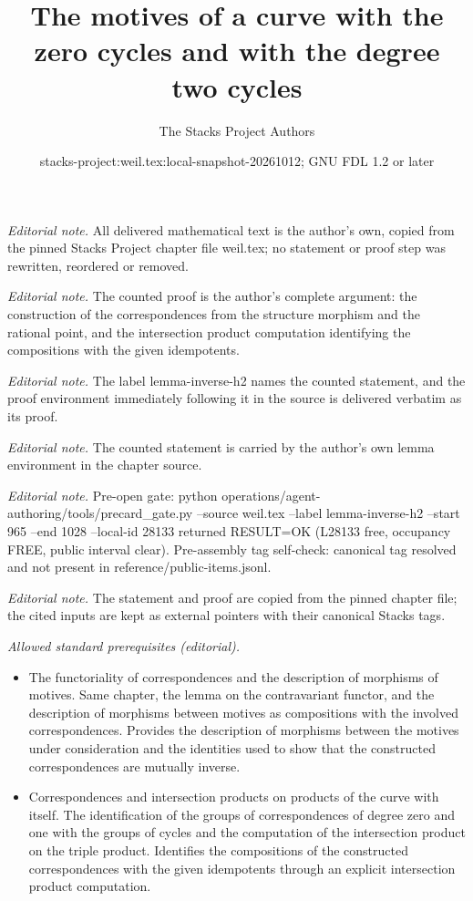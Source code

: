 \documentclass[10pt,a4paper]{amsart}
\title{The motives of a curve with the zero cycles and with the degree two cycles}
\author{The Stacks Project Authors}
\date{stacks-project:weil.tex:local-snapshot-20261012; GNU FDL 1.2 or later}
\theoremstyle{plain}
\theoremstyle{definition}
\theoremstyle{remark}
\numberwithin{equation}{subsection}
\begin{document}
\maketitle
\noindent\textit{Editorial note.} All delivered mathematical text is the author's own, copied from the pinned Stacks Project chapter file weil.tex; no statement or proof step was rewritten, reordered or removed.\par\medskip
\noindent\textit{Editorial note.} The counted proof is the author's complete argument: the construction of the correspondences from the structure morphism and the rational point, and the intersection product computation identifying the compositions with the given idempotents.\par\medskip
\noindent\textit{Editorial note.} The label lemma-inverse-h2 names the counted statement, and the proof environment immediately following it in the source is delivered verbatim as its proof.\par\medskip
\noindent\textit{Editorial note.} The counted statement is carried by the author's own lemma environment in the chapter source.\par\medskip
\noindent\textit{Editorial note.} Pre-open gate: python operations/agent-authoring/tools/precard\_gate.py --source weil.tex --label lemma-inverse-h2 --start 965 --end 1028 --local-id 28133 returned RESULT=OK (L28133 free, occupancy FREE, public interval clear). Pre-assembly tag self-check: canonical tag resolved and not present in reference/public-items.jsonl.\par\medskip
\noindent\textit{Editorial note.} The statement and proof are copied from the pinned chapter file; the cited inputs are kept as external pointers with their canonical Stacks tags.\par\medskip
\noindent\textit{Allowed standard prerequisites (editorial).}\begin{itemize}
\item The functoriality of correspondences and the description of morphisms of motives. Same chapter, the lemma on the contravariant functor, and the description of morphisms between motives as compositions with the involved correspondences. Provides the description of morphisms between the motives under consideration and the identities used to show that the constructed correspondences are mutually inverse.
\item Correspondences and intersection products on products of the curve with itself. The identification of the groups of correspondences of degree zero and one with the groups of cycles and the computation of the intersection product on the triple product. Identifies the compositions of the constructed correspondences with the given idempotents through an explicit intersection product computation.
\end{itemize}\medskip
\end{document}
